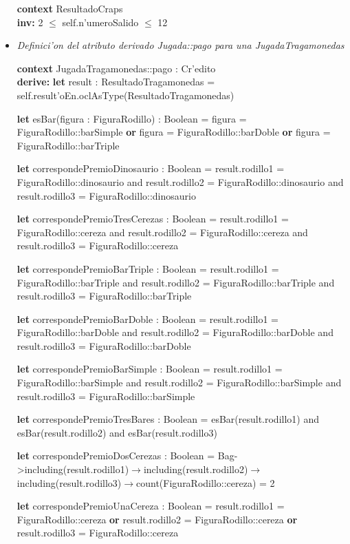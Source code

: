 \begin{itemize}
\textbf{context} ResultadoCraps \\ \textbf{inv:}
    2 $\leq$ self.n'umeroSalido $\leq$ 12



\item \textit{Definici'on del atributo derivado Jugada::pago para una JugadaTragamonedas}

\textbf{context} JugadaTragamonedas::pago : Cr'edito \\ \textbf{derive:}
    \textbf{let} result : ResultadoTragamonedas = self.result'oEn.oclAsType(ResultadoTragamonedas)

    \textbf{let} esBar(figura : FiguraRodillo) : Boolean = figura = FiguraRodillo::barSimple \textbf{or} figura = FiguraRodillo::barDoble \textbf{or} figura = FiguraRodillo::barTriple

    \textbf{let} correspondePremioDinosaurio : Boolean = result.rodillo1 = FiguraRodillo::dinosaurio and result.rodillo2 = FiguraRodillo::dinosaurio and result.rodillo3 = FiguraRodillo::dinosaurio
    
    \textbf{let} correspondePremioTresCerezas : Boolean = result.rodillo1 = FiguraRodillo::cereza and result.rodillo2 = FiguraRodillo::cereza and result.rodillo3 = FiguraRodillo::cereza
    
    \textbf{let} correspondePremioBarTriple : Boolean = result.rodillo1 = FiguraRodillo::barTriple and result.rodillo2 = FiguraRodillo::barTriple and result.rodillo3 = FiguraRodillo::barTriple
    
    \textbf{let} correspondePremioBarDoble : Boolean = result.rodillo1 = FiguraRodillo::barDoble and result.rodillo2 = FiguraRodillo::barDoble and result.rodillo3 = FiguraRodillo::barDoble
    
    \textbf{let} correspondePremioBarSimple : Boolean = result.rodillo1 = FiguraRodillo::barSimple and result.rodillo2 = FiguraRodillo::barSimple and result.rodillo3 = FiguraRodillo::barSimple
    
    \textbf{let} correspondePremioTresBares : Boolean = esBar(result.rodillo1) and esBar(result.rodillo2) and esBar(result.rodillo3)
    
    \textbf{let} correspondePremioDosCerezas : Boolean = Bag{}->including(result.rodillo1)$\rightarrow$including(result.rodillo2)$\rightarrow$including(result.rodillo3)$\rightarrow$count(FiguraRodillo::cereza) = 2
    
    \textbf{let} correspondePremioUnaCereza : Boolean = result.rodillo1 = FiguraRodillo::cereza \textbf{or} result.rodillo2 = FiguraRodillo::cereza \textbf{or} result.rodillo3 = FiguraRodillo::cereza


\end{itemize}
